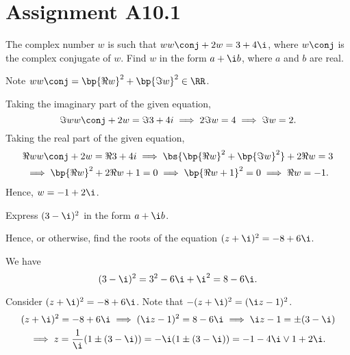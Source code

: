 \clearpage
\section{Assignment A10.1}

\begin{problem}
    The complex number $w$ is such that $w w\conj + 2w = 3 + 4\i$, where $w\conj$ is the complex conjugate of $w$. Find $w$ in the form $a + \i b$, where $a$ and $b$ are real.
\end{problem}
\begin{solution}
    Note $w w\conj = \bp{\Re w}^2 + \bp{\Im w}^2 \in \RR$.

    Taking the imaginary part of the given equation, \[\Im{ww\conj + 2w} = \Im{3 + 4i} \implies 2 \Im w = 4 \implies \Im w = 2.\] Taking the real part of the given equation,
    \begin{gather*}
        \Re{ww\conj + 2w} = \Re{3 + 4i} \implies \bs{\bp{\Re w}^2 + \bp{\Im w}^2} + 2\Re w = 3\\
        \implies \bp{\Re w}^2 + 2\Re {w} + 1 = 0 \implies \bp{\Re w + 1}^2 = 0 \implies \Re{w} = -1.
    \end{gather*}
    Hence, $w = -1 + 2\i$.
\end{solution}

\begin{problem}
    Express $(3 - \i)^2$ in the form $a + \i b$.

    Hence, or otherwise, find the roots of the equation $(z+\i)^2 = -8+6\i$.
\end{problem}
\begin{solution}
    We have \[(3 - \i)^2 = 3^2 - 6 \i + \i^2 = 8 - 6\i.\]

    Consider $(z+\i)^2 = -8+6\i$. Note that $-(z+\i)^2 = (\i z - 1)^2$.
    \begin{gather*}
        (z+\i)^2 = -8 + 6\i \implies (\i z - 1)^2 = 8 - 6\i \implies \i z - 1 = \pm (3 - \i)\\
        \implies z = \frac1\i (1 \pm (3 - \i)) = -\i(1 \pm (3 - \i)) = -1-4\i \lor 1 + 2\i.
    \end{gather*}
\end{solution}


